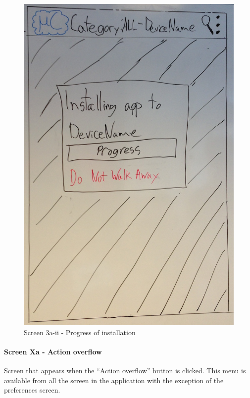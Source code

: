 \begin{figure}[H]
\centering
\includegraphics[scale=0.2]{images/Design_guide/Screen3a-ii.png}
\caption{Screen 3a-ii - Progress of installation}
\label{fig:screen3aii}
\end{figure}


\paragraph{Screen Xa - Action overflow}
Screen that appears when the ``Action overflow'' button is clicked. This menu is available from all the screen in the application with the exception of the preferences screen.

